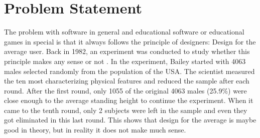 


\section{Problem Statement}
\label{problem_statement}
The problem with software in general and educational software or educational
games in special is that it always follows the principle of designers: Design
for the average user. Back in 1982, an experiment was conducted to study
whether this principle makes any sense or not \cite{Bailey1982}. In the
experiment, Bailey started with
4063 males selected randomly from the population of the USA. The scientist
measured the ten most characterizing physical features and reduced the sample
after each round. After the first round, only 1055 of the original 4063 males
(25.9{\%}) were close enough to the average standing height to continue the
experiment. When it came to the tenth round, only 2 subjects were left in the
sample and even they got eliminated in this last round. This shows that design
for the average is maybe good in theory, but in reality it does not make
much sense.

